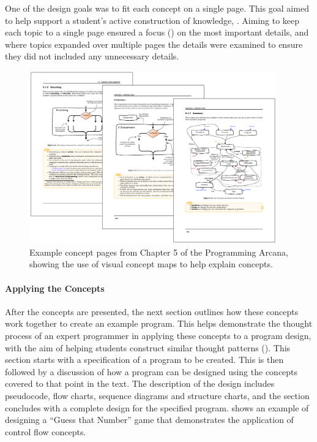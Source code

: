 One of the design goals was to fit each concept on a single page. This goal aimed to help support a student's active construction of knowledge, . Aiming to keep each topic to a single page ensured a focus () on the most important details, and where topics expanded over multiple pages the details were examined to ensure they did not included any unnecessary details.

\begin{figure}[h]
  \centering
  \includegraphics[width=0.95\textwidth]{ArcanaConcepts}
  \caption{Example concept pages from Chapter 5 of the Programming Arcana, showing the use of visual concept maps to help explain concepts. }
  \label{fig:arcana_concepts}
\end{figure}

\clearpage
\paragraph{Applying the Concepts} %
\label{par:applying_the_concepts_}

After the concepts are presented, the next section outlines how these concepts work together to create an example program. This helps demonstrate the thought process of an expert programmer in applying these concepts to a program design, with the aim of helping students construct similar thought patterns (). This section starts with a specification of a program to be created. This is then followed by a discussion of how a program can be designed using the concepts covered to that point in the text. The description of the design includes pseudocode, flow charts, sequence diagrams and structure charts, and the section concludes with a complete design for the specified program.  shows an example of designing a ``Guess that Number'' game that demonstrates the application of control flow concepts.

